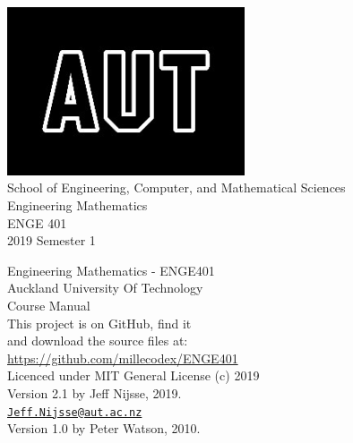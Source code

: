 \documentclass[a4paper,11pt,openany]{book}
\begin{document}
\frontmatter
\begin{titlepage}
\begin{center}

\includegraphics[width=7cm]{AUTlogo}\\
{\vspace{2cm}}
 {\Large School of Engineering, Computer, and Mathematical Sciences}
 \vspace{3cm}\\
 {\huge Engineering Mathematics}\\
 \vspace{1cm}
{\huge ENGE 401} \\
 \vspace{1cm}
{\huge 2019 Semester 1} \\
 \vfill
\end{center}
\end{titlepage}

\clearpage\thispagestyle{empty}
\vspace*{\fill}
Engineering Mathematics - ENGE401\\
Auckland University Of Technology\\
Course Manual\\

This project is on GitHub, find it \\
and download the source files at: \\
\url{https://github.com/millecodex/ENGE401} \\                            

Licenced under MIT General License (c) 2019 \\   

Version 2.1 by Jeff Nijsse, 2019.\\
\href{mailto:Jeff.Nijsse@aut.ac.nz}{\texttt{Jeff.Nijsse@aut.ac.nz}}\\
Version 1.0 by Peter Watson, 2010.


\clearpage
{}
\tableofcontents
\mainmatter

%
%
%
%
%

%

\backmatter
%
%
\end{document}
